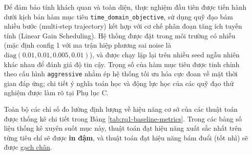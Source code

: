 \documentclass[conference, a4paper]{IEEEtran}
\begin{document}
Để đảm bảo tính khách quan và toàn diện, thực nghiệm đầu tiên được tiến hành dưới kịch bản hàm mục tiêu \texttt{time\_domain\_objective}, sử dụng quỹ đạo bám nhiều bước (multi-step trajectory) kết hợp với cơ chế phân đoạn tăng ích tuyến tính (Linear Gain Scheduling). Hệ thống được đặt trong môi trường có nhiễu (mặc định config 1 với ma trận hiệp phương sai noise là $\mathrm{diag}(0.01, 0.01, 0.005, 0.01)$), và được chạy lặp lại trên nhiều seed ngẫu nhiên khác nhau để đánh giá độ tin cậy. Trọng số của hàm mục tiêu được tinh chỉnh theo cấu hình \texttt{aggressive} nhằm ép hệ thống tối ưu hóa cực đoan về mặt thời gian đáp ứng; chi tiết ý nghĩa toán học và động lực học của các quỹ đạo thử nghiệm được làm rõ tại Phụ lục C.

Toàn bộ các chỉ số đo lường định lượng về hiệu năng cơ sở của các thuật toán được thống kê chi tiết trong Bảng \ref{tab:rq1-baseline-metrics}. Trong các bảng số liệu thống kê xuyên suốt mục này, thuật toán đạt hiệu năng xuất sắc nhất trên từng tiêu chí sẽ được \textbf{in đậm}, và thuật toán đạt hiệu năng bám đuổi (tốt nhì) sẽ được \underline{gạch chân}.
\end{document}
